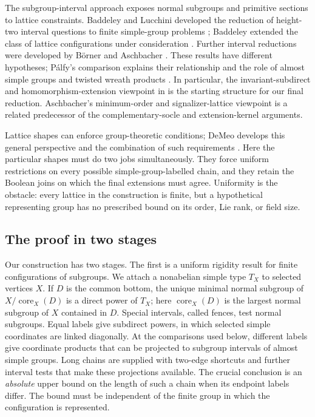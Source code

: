 The subgroup-interval approach exposes normal subgroups and primitive
sections to lattice constraints.  Baddeley and Lucchini developed the
reduction of height-two interval questions to finite simple-group problems
\cite{BaddeleyLucchini1997}; Baddeley extended the class of lattice
configurations under consideration \cite{Baddeley1998}.
Further interval reductions were developed by B\"orner and Aschbacher
\cite{Borner1999,Aschbacher2008}.  These results have different hypotheses;
P\'alfy's comparison explains their relationship and the role of almost
simple groups and twisted wreath products \cite[Section~4]{PalfyTwisted}.
In particular, the invariant-subdirect and homomorphism-extension viewpoint
in \cite{PalfyTwisted} is the starting structure for our final reduction.
Aschbacher's minimum-order and signalizer-lattice viewpoint is a related
predecessor of the complementary-socle and extension-kernel arguments.

Lattice shapes can enforce group-theoretic conditions; DeMeo develops
this general perspective and the combination of such requirements
\cite{DeMeoInterval2014}.  Here the particular shapes must do two jobs
simultaneously.  They force uniform restrictions on every possible
simple-group-labelled chain, and they retain the Boolean joins on which
the final extensions must agree.  Uniformity is the obstacle: every
lattice in the construction is finite, but a hypothetical representing
group has no prescribed bound on its order, Lie rank, or field size.

\subsection{The proof in two stages}

Our construction has two stages. The first is a uniform rigidity result
for finite configurations of subgroups. We attach a nonabelian simple
type $T_X$ to selected vertices $X$.  If $D$ is the common bottom,
the unique minimal normal subgroup of $X/\operatorname{core}_X(D)$
is a direct power of $T_X$; here $\operatorname{core}_X(D)$ is the
largest normal subgroup of $X$ contained in $D$.
Special intervals, called fences, test normal subgroups.  Equal labels
give subdirect powers, in which selected simple coordinates are linked
diagonally.  At the comparisons used below, different labels give
coordinate products that can be projected to subgroup intervals of
almost simple groups.
Long chains are supplied with two-edge shortcuts and further interval
tests that make these projections available.  The crucial conclusion
is an \emph{absolute} upper bound
on the length of such a chain when its endpoint labels differ.
The bound must be independent of the finite group in which the
configuration is represented.

